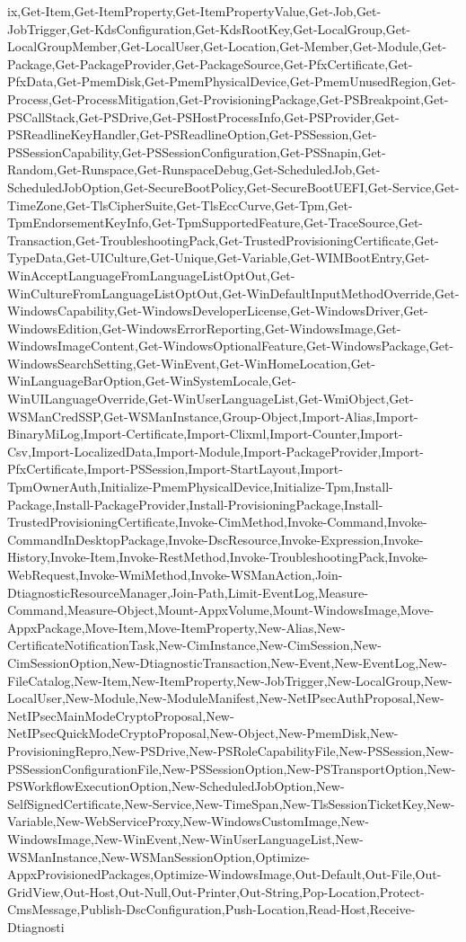 {{ix,Get-Item,Get-ItemProperty,Get-ItemPropertyValue,Get-Job,Get-JobTrigger,Get-KdsConfiguration,Get-KdsRootKey,Get-LocalGroup,Get-LocalGroupMember,Get-LocalUser,Get-Location,Get-Member,Get-Module,Get-Package,Get-PackageProvider,Get-PackageSource,Get-PfxCertificate,Get-PfxData,Get-PmemDisk,Get-PmemPhysicalDevice,Get-PmemUnusedRegion,Get-Process,Get-ProcessMitigation,Get-ProvisioningPackage,Get-PSBreakpoint,Get-PSCallStack,Get-PSDrive,Get-PSHostProcessInfo,Get-PSProvider,Get-PSReadlineKeyHandler,Get-PSReadlineOption,Get-PSSession,Get-PSSessionCapability,Get-PSSessionConfiguration,Get-PSSnapin,Get-Random,Get-Runspace,Get-RunspaceDebug,Get-ScheduledJob,Get-ScheduledJobOption,Get-SecureBootPolicy,Get-SecureBootUEFI,Get-Service,Get-TimeZone,Get-TlsCipherSuite,Get-TlsEccCurve,Get-Tpm,Get-TpmEndorsementKeyInfo,Get-TpmSupportedFeature,Get-TraceSource,Get-Transaction,Get-TroubleshootingPack,Get-TrustedProvisioningCertificate,Get-TypeData,Get-UICulture,Get-Unique,Get-Variable,Get-WIMBootEntry,Get-WinAcceptLanguageFromLanguageListOptOut,Get-WinCultureFromLanguageListOptOut,Get-WinDefaultInputMethodOverride,Get-WindowsCapability,Get-WindowsDeveloperLicense,Get-WindowsDriver,Get-WindowsEdition,Get-WindowsErrorReporting,Get-WindowsImage,Get-WindowsImageContent,Get-WindowsOptionalFeature,Get-WindowsPackage,Get-WindowsSearchSetting,Get-WinEvent,Get-WinHomeLocation,Get-WinLanguageBarOption,Get-WinSystemLocale,Get-WinUILanguageOverride,Get-WinUserLanguageList,Get-WmiObject,Get-WSManCredSSP,Get-WSManInstance,Group-Object,Import-Alias,Import-BinaryMiLog,Import-Certificate,Import-Clixml,Import-Counter,Import-Csv,Import-LocalizedData,Import-Module,Import-PackageProvider,Import-PfxCertificate,Import-PSSession,Import-StartLayout,Import-TpmOwnerAuth,Initialize-PmemPhysicalDevice,Initialize-Tpm,Install-Package,Install-PackageProvider,Install-ProvisioningPackage,Install-TrustedProvisioningCertificate,Invoke-CimMethod,Invoke-Command,Invoke-CommandInDesktopPackage,Invoke-DscResource,Invoke-Expression,Invoke-History,Invoke-Item,Invoke-RestMethod,Invoke-TroubleshootingPack,Invoke-WebRequest,Invoke-WmiMethod,Invoke-WSManAction,Join-DtiagnosticResourceManager,Join-Path,Limit-EventLog,Measure-Command,Measure-Object,Mount-AppxVolume,Mount-WindowsImage,Move-AppxPackage,Move-Item,Move-ItemProperty,New-Alias,New-CertificateNotificationTask,New-CimInstance,New-CimSession,New-CimSessionOption,New-DtiagnosticTransaction,New-Event,New-EventLog,New-FileCatalog,New-Item,New-ItemProperty,New-JobTrigger,New-LocalGroup,New-LocalUser,New-Module,New-ModuleManifest,New-NetIPsecAuthProposal,New-NetIPsecMainModeCryptoProposal,New-NetIPsecQuickModeCryptoProposal,New-Object,New-PmemDisk,New-ProvisioningRepro,New-PSDrive,New-PSRoleCapabilityFile,New-PSSession,New-PSSessionConfigurationFile,New-PSSessionOption,New-PSTransportOption,New-PSWorkflowExecutionOption,New-ScheduledJobOption,New-SelfSignedCertificate,New-Service,New-TimeSpan,New-TlsSessionTicketKey,New-Variable,New-WebServiceProxy,New-WindowsCustomImage,New-WindowsImage,New-WinEvent,New-WinUserLanguageList,New-WSManInstance,New-WSManSessionOption,Optimize-AppxProvisionedPackages,Optimize-WindowsImage,Out-Default,Out-File,Out-GridView,Out-Host,Out-Null,Out-Printer,Out-String,Pop-Location,Protect-CmsMessage,Publish-DscConfiguration,Push-Location,Read-Host,Receive-Dtiagnosti}}
